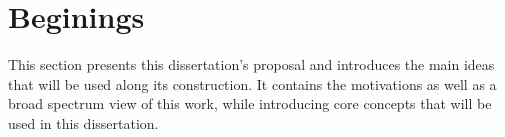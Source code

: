 \chapter{Beginings}

This section presents this dissertation's proposal and introduces the main ideas that will be used along its construction. It contains the motivations as well as a broad spectrum view of this work, while introducing core concepts that will be used in this dissertation.




